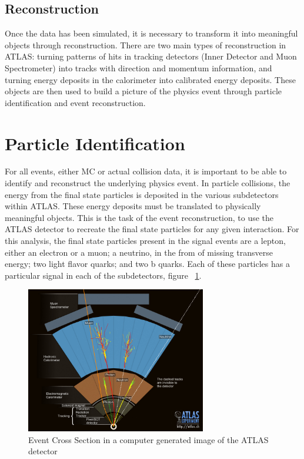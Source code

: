 \subsection{Reconstruction}
Once the data has been simulated, it is necessary to transform it into meaningful objects through reconstruction. There are two main types of reconstruction in ATLAS: turning patterns of hits in tracking detectors (Inner Detector and Muon Spectrometer) into tracks with direction and momentum information, and turning energy deposits in the calorimeter into calibrated energy deposits. These objects are then used to build a picture of the physics event through particle identification and event reconstruction. 
\section{Particle Identification}
For all events, either MC or actual collision data, it is important to be able to identify and reconstruct the underlying physics event. In particle collisions, the energy from the final state particles is deposited in the various subdetectors within ATLAS. These energy deposits must be translated to physically meaningful objects. This is the task of the event reconstruction, to use the ATLAS detector to recreate the final state particles for any given interaction. For this analysis, the final state particles present in the signal events are a lepton, either an electron or a muon; a neutrino, in the from of missing transverse energy; two light flavor quarks; and two b quarks. Each of these particles has a particular signal in each of the subdetectors, figure ~\ref{fig:crossSec}.

\begin{figure}[h]
\begin{center}
\includegraphics*[width=0.70\textwidth] {figures/layers}
\caption[Cartoon showing particle interating in ATLAS detector subsystems]{Event Cross Section in a computer generated image of the ATLAS detector \cite{Pequenao:1096081}}
\label{fig:crossSec}
\end{center}
\end{figure}


